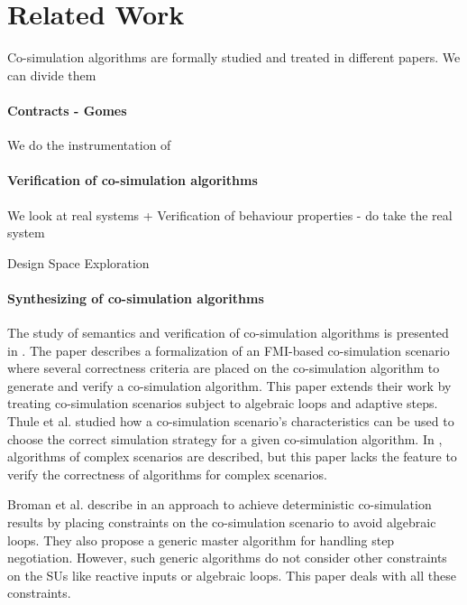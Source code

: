 \section{Related Work}\label{sc:related}

Co-simulation algorithms are formally studied and treated in different papers.
We can divide them 



\paragraph{Contracts - Gomes}
We do the instrumentation of 

\paragraph{Verification of co-simulation algorithms}
We look at real systems + Verification of behaviour properties - do take the real system 

Design Space Exploration

\paragraph{Synthesizing of co-simulation algorithms}



The study of semantics and verification of co-simulation algorithms is presented in \cite{Gomes2019c,Gomes2019a,Broman2013,hansen_verification_2021}. 
The paper \cite{Gomes2019c} describes a formalization of an FMI-based co-simulation scenario where several correctness criteria are placed on the co-simulation algorithm to generate and verify a co-simulation algorithm. 
This paper extends their work by treating co-simulation scenarios subject to algebraic loops and adaptive steps.
Thule et al. \cite{Thule_2018} studied how a co-simulation scenario's characteristics can be used to choose the correct simulation strategy for a given co-simulation algorithm. 
In \cite{thrane2021}, algorithms of complex scenarios are described, but this paper lacks the feature to verify the correctness of algorithms for complex scenarios.

Broman et al. describe in \cite{Broman2013} an approach to achieve deterministic co-simulation results by placing constraints on the co-simulation scenario to avoid algebraic loops. 
They also propose a generic master algorithm for handling step negotiation. 
However, such generic algorithms do not consider other constraints on the SUs like reactive inputs or algebraic loops. This paper deals with all these constraints.

